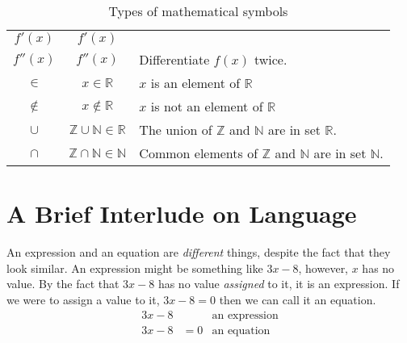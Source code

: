 \begin{table}[!htb]
\begin{tabularx}{\linewidth}{| c || c | X |}
  $f'(x)$             & $f'(x)$              &                                \\
  $f''(x)$            & $f''(x)$             & Differentiate $f(x)$ twice.    \\ \hline
  $\in$     & $x\in\mathbb{R}$    & $x$ is an element of $\mathbb{R}$         \\
  $\notin$  & $x\notin\mathbb{R}$ & $x$ is not an element of $\mathbb{R}$     \\ \hline
  $\cup$    & $\mathbb{Z}\cup\mathbb{N} \in \mathbb{R}$
                                  & The union of $\mathbb{Z}$ and $\mathbb{N}$ are in set $\mathbb{R}$.\\
  $\cap$    & $\mathbb{Z}\cap\mathbb{N} \in \mathbb{N}$
                                  & Common elements of $\mathbb{Z}$ and $\mathbb{N}$ are in set $\mathbb{N}$.
                                                                       \\ \hline
\end{tabularx}
\caption{Types of mathematical symbols}
\end{table}

\newpage
\section{A Brief Interlude on Language}
\label{sec:ABriefInterludeOnLanguage}
An expression and an equation are \emph{different} things, despite the fact that
they look similar. An expression might be something like $3x - 8$, however, $x$
has no value. By the fact that $3x - 8$ has no value \emph{assigned} to it, it
is an expression. If we were to assign a value to it, $3x-8 = 0$ then we can
call it an equation.
\begin{align}
  3x - 8 &     & \text{an expression}\\
  3x - 8 & = 0 & \text{an equation}\\
\end{align}